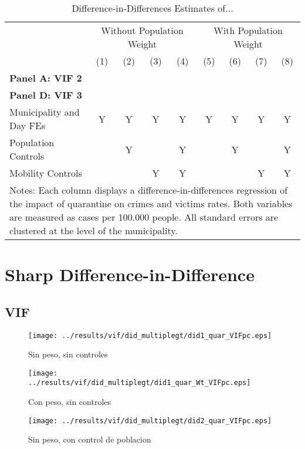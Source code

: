 \documentclass[11pt,letterpaper]{article}
\begin{document}
\begin{landscape}
  \begin{table}
    \centering
    \caption{Difference-in-Differences Estimates of...} \label{tab:DD}
    \begin{tabular}{lcccccccc} \toprule
      &\multicolumn{4}{c}{Without Population Weight}&\multicolumn{4}{c}{With Population Weight} \\ 
      \cmidrule(r){2-5}\cmidrule(r){6-9}
      &(1)&(2)&(3)&(4)&(5)&(6)&(7)&(8) \\ \midrule
      \multicolumn{9}{l}{\textbf{Panel A: VIF 2}} \\
      
      \midrule
      \multicolumn{9}{l}{\textbf{Panel D: VIF 3}} \\
      
      \midrule
      Municipality and Day FEs &Y&Y&Y&Y&Y&Y&Y&Y \\
      Population Controls      & &Y& &Y& &Y& &Y \\
      Mobility Controls        & & &Y&Y& & &Y&Y \\
      \bottomrule
      \multicolumn{9}{p{21.8cm}}{{\footnotesize Notes: Each column displays a difference-in-differences regression of the impact of quarantine on crimes and victims rates. Both variables are measured as cases per 100.000 people.  All standard errors are clustered at the level of the municipality.}}
    \end{tabular}
  \end{table}
\end{landscape}


\section{Sharp Difference-in-Difference}
	\subsection{VIF}
\begin{figure}[H]
\caption{Sin peso, sin controles}
\centering
\texttt{[image: ../results/vif/did\_multiplegt/did1\_quar\_VIFpc.eps]}
\end{figure}

\begin{figure}[H]
\caption{Con peso, sin controles}
\centering
\texttt{[image: ../results/vif/did\_multiplegt/did1\_quar\_Wt\_VIFpc.eps]}
\end{figure}
\begin{figure}[H]
\caption{Sin peso, con control de poblacion}
\centering
\texttt{[image: ../results/vif/did\_multiplegt/did2\_quar\_VIFpc.eps]}
\end{figure}
\end{document}
